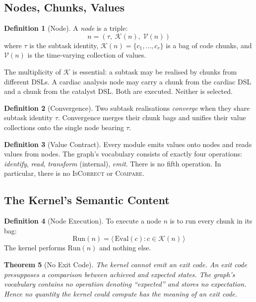 \documentclass[11pt,a4paper]{article}
\newtheorem{theorem}{Theorem}[section]
\theoremstyle{definition}
\newtheorem{definition}[theorem]{Definition}
\theoremstyle{remark}
\begin{document}
\subsection{Nodes, Chunks, Values}

\begin{definition}[Node]
A \emph{node} is a triple:
\begin{equation}
n = (\tau,\; \mathcal{K}(n),\; \mathcal{V}(n))
\end{equation}
where $\tau$ is the subtask identity, $\mathcal{K}(n) = \{c_1, \ldots, c_r\}$ is a bag of code chunks, and $\mathcal{V}(n)$ is the time-varying collection of values.
\end{definition}

The multiplicity of $\mathcal{K}$ is essential: a subtask may be realised by chunks from different DSLs. A cardiac analysis node may carry a chunk from the cardiac DSL and a chunk from the catalyst DSL. Both are executed. Neither is selected.

\begin{definition}[Convergence]
Two subtask realisations \emph{converge} when they share subtask identity $\tau$. Convergence merges their chunk bags and unifies their value collections onto the single node bearing $\tau$.
\end{definition}

\begin{definition}[Value Contract]
Every module emits values onto nodes and reads values from nodes. The graph's vocabulary consists of exactly four operations: \emph{identify}, \emph{read}, \emph{transform} (internal), \emph{emit}. There is no fifth operation. In particular, there is no \textsc{IsCorrect} or \textsc{Compare}.
\end{definition}

\subsection{The Kernel's Semantic Content}

\begin{definition}[Node Execution]
To execute a node $n$ is to run every chunk in its bag:
\begin{equation}
\mathrm{Run}(n) = \langle\, \mathrm{Eval}(c) : c \in \mathcal{K}(n) \,\rangle
\end{equation}
The kernel performs $\mathrm{Run}(n)$ and nothing else.
\end{definition}

\begin{theorem}[No Exit Code]
\label{thm:no-exit-kernel}
The kernel cannot emit an exit code. An exit code presupposes a comparison between achieved and expected states. The graph's vocabulary contains no operation denoting ``expected'' and stores no expectation. Hence no quantity the kernel could compute has the meaning of an exit code.
\end{theorem}
\end{document}
